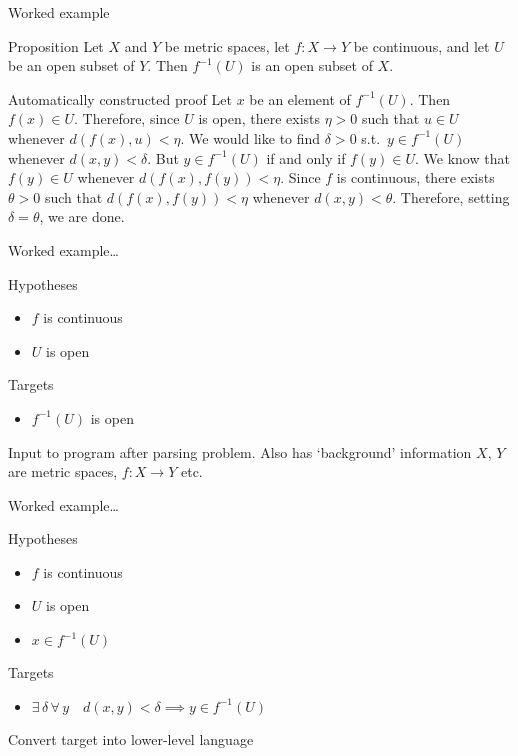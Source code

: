 \begin{frame}{Worked example}
  \begin{block}{Proposition}
Let $X$ and $Y$ be metric spaces, let $f : X \to Y$ be continuous, and let $U$ be an open subset of $Y$.
Then $f^{-1}(U)$ is an open subset of $X$.
  \end{block}
  \vspace{3\baselineskip}
  \begin{block}{Automatically constructed proof}
Let $x$ be an element of $f^{-1}(U)$. Then $f(x) \in U$. Therefore, since $U$ is open, there exists $\eta > 0$ such that $u \in U$ whenever $d(f(x), u) < \eta$. We would like to find $\delta > 0$ s.t.\ $y \in f^{-1}(U)$ whenever $d(x, y) < \delta$. But $y \in f^{-1}(U)$ if and only if $f(y) \in U$. We know that $f(y) \in U$ whenever $d(f(x), f(y)) < \eta$. Since $f$ is continuous, there exists $\theta > 0$ such that $d(f(x), f(y)) < \eta$ whenever $d(x, y) < \theta$. Therefore, setting $\delta = \theta$, we are done.
  \end{block}
\end{frame}

\begin{frame}{Worked example\ldots}
  \begin{block}{Hypotheses}
    \begin{itemize}
      \item $f$ is continuous
      \item $U$ is open
    \end{itemize}
  \end{block}
  \begin{block}{Targets}
    \begin{itemize}
      \item $f^{-1}(U)$ is open
    \end{itemize}
  \end{block}
  \begin{block}{}
    Input to program after parsing problem.
    Also has `background' information \eg $X$, $Y$ are metric spaces, $f : X \to Y$ etc.
  \end{block}
\end{frame}

\begin{frame}{Worked example\ldots}
  \begin{block}{Hypotheses}
    \begin{itemize}
      \item $f$ is continuous
      \item $U$ is open
      \item $x \in f^{-1}(U)$
    \end{itemize}
  \end{block}
  \begin{block}{Targets}
    \begin{itemize}
      \item $\exists\,\delta\,\forall\,y\quad d(x, y) < \delta \implies y \in f^{-1}(U)$
    \end{itemize}
  \end{block}
  \begin{block}{}
    Convert target into lower-level language
  \end{block}
\end{frame}

